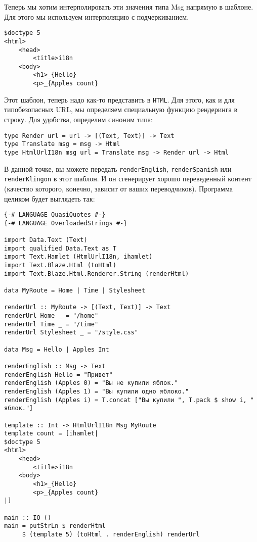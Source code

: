Теперь мы хотим интерполировать эти значения типа Msg напрямую в шаблоне.
Для этого мы используем интерполяцию с подчеркиванием.

\begin{lstlisting}
$doctype 5
<html>
    <head>
        <title>i18n
    <body>
        <h1>_{Hello}
        <p>_{Apples count}
\end{lstlisting}

Этот шаблон, теперь надо как-то представить в \texttt{HTML}.  Для этого, как и для типобезопасных URL, 
мы определяем специальную функцию рендеринга в строку.
Для удобства, определим синоним типа:

\begin{lstlisting}
type Render url = url -> [(Text, Text)] -> Text
type Translate msg = msg -> Html
type HtmlUrlI18n msg url = Translate msg -> Render url -> Html
\end{lstlisting}

В данной точке, вы можете передать \lstinline!renderEnglish!, 
\lstinline!renderSpanish! или \lstinline!renderKlingon! в этот шаблон. И он
сгенерирует хорошо переведенный контент (качество которого, конечно, зависит от
ваших переводчиков). Программа целиком будет выглядеть так:
\begin{lstlisting}
{-# LANGUAGE QuasiQuotes #-}
{-# LANGUAGE OverloadedStrings #-}

import Data.Text (Text)
import qualified Data.Text as T
import Text.Hamlet (HtmlUrlI18n, ihamlet)
import Text.Blaze.Html (toHtml)
import Text.Blaze.Html.Renderer.String (renderHtml)

data MyRoute = Home | Time | Stylesheet

renderUrl :: MyRoute -> [(Text, Text)] -> Text
renderUrl Home _ = "/home"
renderUrl Time _ = "/time"
renderUrl Stylesheet _ = "/style.css"

data Msg = Hello | Apples Int

renderEnglish :: Msg -> Text
renderEnglish Hello = "Привет"
renderEnglish (Apples 0) = "Вы не купили яблок."
renderEnglish (Apples 1) = "Вы купили одно яблоко."
renderEnglish (Apples i) = T.concat ["Вы купили ", T.pack $ show i, " яблок."]

template :: Int -> HtmlUrlI18n Msg MyRoute
template count = [ihamlet|
$doctype 5
<html>
    <head>
        <title>i18n
    <body>
        <h1>_{Hello}
        <p>_{Apples count}
|]

main :: IO ()
main = putStrLn $ renderHtml
     $ (template 5) (toHtml . renderEnglish) renderUrl
\end{lstlisting}

